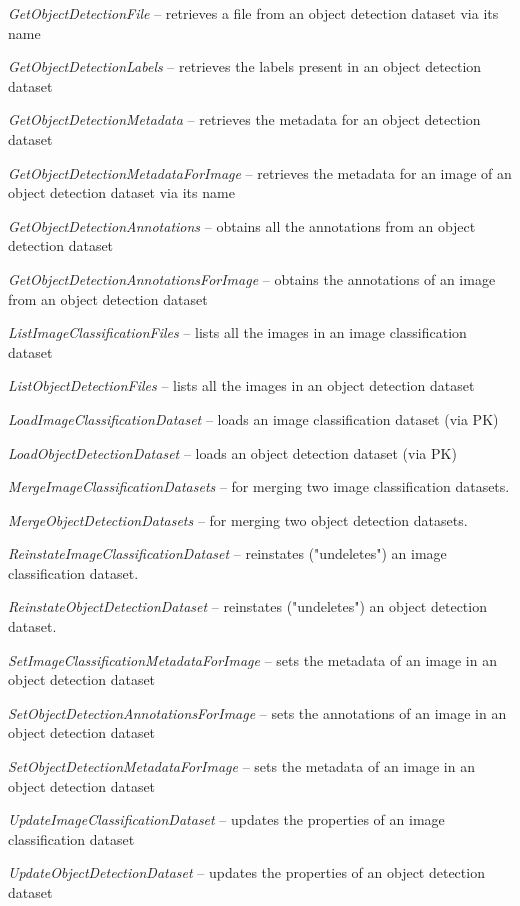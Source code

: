 \documentclass[a4paper]{book}
\begin{document}
\begin{tight_itemize}
  \item \textit{GetObjectDetectionFile} -- retrieves a file from an object detection dataset via its name
  \item \textit{GetObjectDetectionLabels} -- retrieves the labels present in an object detection dataset
  \item \textit{GetObjectDetectionMetadata} -- retrieves the metadata for an object detection dataset
  \item \textit{GetObjectDetectionMetadataForImage} -- retrieves the metadata for an image of an object detection dataset via its name
  \item \textit{GetObjectDetectionAnnotations} -- obtains all the annotations from an object detection dataset
  \item \textit{GetObjectDetectionAnnotationsForImage} -- obtains the annotations of an image from an object detection dataset
  \item \textit{ListImageClassificationFiles} -- lists all the images in an image classification dataset
  \item \textit{ListObjectDetectionFiles} -- lists all the images in an object detection dataset
  \item \textit{LoadImageClassificationDataset} -- loads an image classification dataset (via PK)
  \item \textit{LoadObjectDetectionDataset} -- loads an object detection dataset (via PK)
  \item \textit{MergeImageClassificationDatasets} -- for merging two image classification datasets.
  \item \textit{MergeObjectDetectionDatasets} -- for merging two object detection datasets.
  \item \textit{ReinstateImageClassificationDataset} -- reinstates ("undeletes") an image classification dataset.
  \item \textit{ReinstateObjectDetectionDataset} -- reinstates ("undeletes") an object detection dataset.
  \item \textit{SetImageClassificationMetadataForImage} -- sets the metadata of an image in an object detection dataset
  \item \textit{SetObjectDetectionAnnotationsForImage} -- sets the annotations of an image in an object detection dataset
  \item \textit{SetObjectDetectionMetadataForImage} -- sets the metadata of an image in an object detection dataset
  \item \textit{UpdateImageClassificationDataset} -- updates the properties of an image classification dataset
  \item \textit{UpdateObjectDetectionDataset} -- updates the properties of an object detection dataset
\end{tight_itemize}
\end{document}
